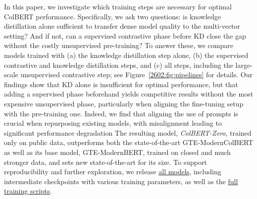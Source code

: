 In this paper, we investigate which training steps are necessary for optimal ColBERT performance. Specifically, we ask two questions: is knowledge distillation alone sufficient to transfer dense model quality to the multi-vector setting? And if not, can a supervised contrastive phase before KD close the gap without the costly unsupervised pre-training? To answer these, we compare models trained with (a) the knowledge distillation step alone, (b) the supervised contrastive and knowledge distillation steps, and (c) all steps, including the large-scale unsupervised contrastive step; see Figure~\ref{2602:fig:pipelines} for details. Our findings show that KD alone is insufficient for optimal performance, but that adding a supervised phase beforehand yields competitive results without the most expensive unsupervised phase, particularly when aligning the fine-tuning setup with the pre-training one. Indeed, we find that aligning the use of prompts is crucial when repurposing existing models, with misalignment leading to significant performance degradation The resulting model, \emph{ColBERT-Zero}, trained only on public data, outperforms both the state-of-the-art GTE-ModernColBERT as well as its base model, GTE-ModernBERT, trained on closed and much stronger data, and sets new state-of-the-art for its size. To support reproducibility and further exploration, we release \href{https://huggingface.co/collections/lightonai/colbert-zero}{all models}, including intermediate checkpoints with various training parameters, as well as the \href{https://github.com/lightonai/pylate/tree/main/examples/train/ColBERT-zero/}{full training scripts}.

